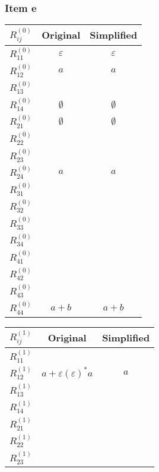 \documentclass[docid=2017/18]{tcom_exam}
\begin{document}
{\subsubsection{Item e}
\begin{minipage}[c]{0.49\textwidth}
	\begin{center}
		\begin{tabular}{r || c | c}
			$R_{ij}^{(0)}$ & Original & Simplified \\ \hline
			$R_{11}^{(0)}$ & $\varepsilon$ &$\varepsilon$ \\
			$R_{12}^{(0)}$ & $a$ & $a$  \\
			$R_{13}^{(0)}$ &   &   \\
			$R_{14}^{(0)}$ & $\emptyset$ & $\emptyset$  \\ 
			$R_{21}^{(0)}$ & $\emptyset$ & $\emptyset$   \\
			$R_{22}^{(0)}$ &   &   \\
			$R_{23}^{(0)}$ &   &   \\
			$R_{24}^{(0)}$ & $a$ & $a$  \\ 
			$R_{31}^{(0)}$ &   &   \\
			$R_{32}^{(0)}$ &   &   \\
			$R_{33}^{(0)}$ &   &   \\
			$R_{34}^{(0)}$ &   &   \\
			$R_{41}^{(0)}$ &   &   \\
			$R_{42}^{(0)}$ &   &   \\
			$R_{43}^{(0)}$ &   &   \\
			$R_{44}^{(0)}$ & $a+b$ &  $a+b$ \\  
		\end{tabular}
	\end{center}
\end{minipage}
\begin{minipage}[c]{0.49\textwidth}
	\begin{center}
		\begin{tabular}{r || c | c}
			$R_{ij}^{(1)}$ & Original & Simplified \\ \hline
			$R_{11}^{(1)}$ &   &   \\
			$R_{12}^{(1)}$ & $a+\varepsilon(\varepsilon)^*a$ & $a$ \\
			$R_{13}^{(1)}$ &   &   \\
			$R_{14}^{(1)}$ &   &   \\ 
			$R_{21}^{(1)}$ &   &   \\
			$R_{22}^{(1)}$ &   &   \\
			$R_{23}^{(1)}$ &   &   \\

\end{tabular}
\end{center}
\end{minipage}}
\end{document}
